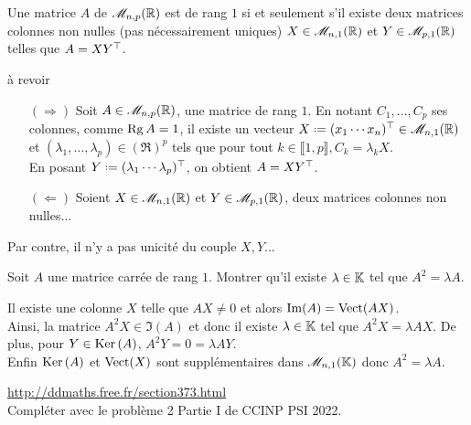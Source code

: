 \begin{prop}
    Une matrice $A$ de $\mathscr{M}_{n,p}(\mathbb{R})$ est de rang $1$ si et seulement s'il existe deux matrices colonnes non nulles (pas nécessairement uniques) $X \in \mathscr{M}_{n,1}(\mathbb{R})$ et $Y \in \mathscr{M}_{p,1}(\mathbb{R})$ telles que $A = X Y^\top$. 
\end{prop}

\begin{preuve}
    à revoir
    \begin{itemize}
        \item[$(\Rightarrow)$] Soit $A \in \mathscr{M}_{n,p}(\mathbb{R})$, une matrice de rang $1$. En notant $C_1, \dots, C_p$ ses colonnes, comme $\mathrm{Rg}\, A = 1$, il existe un vecteur $X \defeq \Trsp{(x_1 \cdots x_n)}\in \M_{n,1}(\R)$ et $(\lambda_1, \dots, \lambda_p) \in (\Re)^p$ tels que pour tout $k \in \llbracket 1, p \rrbracket, C_k = \lambda_k X$. \\
        En posant $Y \defeq \Trsp{(\lambda_1 \cdots \lambda_p)}$, on obtient $A = X Y^\top$.
        \item[$(\Leftarrow)$] Soient $X \in \mathscr{M}_{n,1}(\mathbb{R})$ et $Y \in \mathscr{M}_{p,1}(\mathbb{R})$, deux matrices colonnes non nulles...
    \end{itemize}
    Par contre, il n'y a pas unicité du couple $X, Y$...
\end{preuve}

\begin{exercice}
    Soit $A$ une matrice carrée de rang $1$. Montrer qu'il existe $\lambda \in \mathbb{K}$ tel que $A^2 = \lambda A$.
\end{exercice}

\begin{solution}
    Il existe une colonne $X$ telle que $AX \not= 0$ et alors $\Im(A) = \mathrm{Vect}(AX)$. \\
    Ainsi, la matrice $A^2X \in \Im(A)$ et donc il existe $\lambda \in \mathbb{K}$ tel que $A^2X = \lambda AX$. De plus, pour $Y \in \mathrm{Ker}\,(A)$, $A^2Y = 0 = \lambda AY$. \\
    Enfin $\mathrm{Ker}\,(A)$ et $\mathrm{Vect}(X)$ sont supplémentaires dans $\mathscr{M}_{n,1}(\mathbb{K})$ donc $A^2 = \lambda A$.
\end{solution}

\url{http://ddmaths.free.fr/section373.html} \\
Compléter avec le problème 2 Partie I de CCINP PSI 2022.